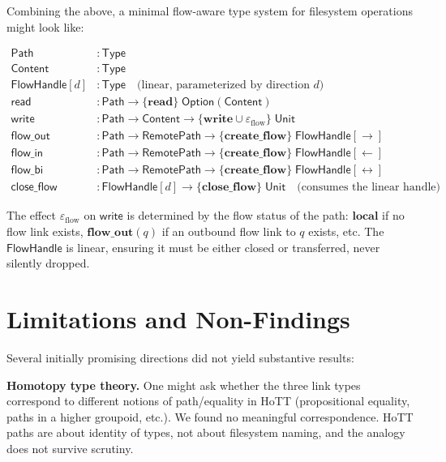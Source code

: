 \documentclass[11pt]{article}
\newcommand{\tp}[1]{\mathsf{#1}}
\newcommand{\kw}[1]{\mathbf{#1}}
\begin{document}
Combining the above, a minimal flow-aware type system for filesystem operations
might look like:

\begin{align*}
  \tp{Path} &: \tp{Type} \\
  \tp{Content} &: \tp{Type} \\
  \tp{FlowHandle}[d] &: \tp{Type} \quad \text{(linear, parameterized by direction } d \text{)} \\[6pt]
  \tp{read} &: \tp{Path} \to \{\kw{read}\}\; \tp{Option}(\tp{Content}) \\
  \tp{write} &: \tp{Path} \to \tp{Content} \to \{\kw{write} \cup \varepsilon_{\text{flow}}\}\; \tp{Unit} \\[6pt]
  \tp{flow\_out} &: \tp{Path} \to \tp{RemotePath} \to
    \{\kw{create\_flow}\}\; \tp{FlowHandle}[\rightarrow] \\
  \tp{flow\_in} &: \tp{Path} \to \tp{RemotePath} \to
    \{\kw{create\_flow}\}\; \tp{FlowHandle}[\leftarrow] \\
  \tp{flow\_bi} &: \tp{Path} \to \tp{RemotePath} \to
    \{\kw{create\_flow}\}\; \tp{FlowHandle}[\leftrightarrow] \\[6pt]
  \tp{close\_flow} &: \tp{FlowHandle}[d] \to \{\kw{close\_flow}\}\; \tp{Unit}
    \quad \text{(consumes the linear handle)}
\end{align*}

The effect $\varepsilon_{\text{flow}}$ on $\tp{write}$ is determined by the
flow status of the path: $\kw{local}$ if no flow link exists, $\kw{flow\_out}(q)$
if an outbound flow link to $q$ exists, etc. The $\tp{FlowHandle}$ is linear,
ensuring it must be either closed or transferred, never silently dropped.


\section{Limitations and Non-Findings}

Several initially promising directions did not yield substantive results:

\textbf{Homotopy type theory.} One might ask whether the three link types
correspond to different notions of path/equality in HoTT (propositional
equality, paths in a higher groupoid, etc.). We found no meaningful
correspondence. HoTT paths are about identity of types, not about filesystem
naming, and the analogy does not survive scrutiny.
\end{document}
